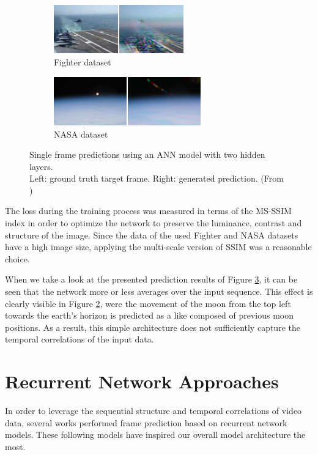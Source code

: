 \begin{figure}[htb]
\centering
\begin{subfigure}{0.5\textwidth}
  \centering
  \includegraphics[height=2.1cm]{figures/related/fighter.png}
  \caption{Fighter dataset}
  \label{fig:aan_samples_fighter}
\end{subfigure}%
\begin{subfigure}{0.5\textwidth}
  \centering
  \includegraphics[height=2.1cm]{figures/related/nasa.png}
  \caption{NASA dataset}
  \label{fig:aan_samples_nasa}
\end{subfigure}
\caption[ANN Frame Prediction]{Single frame predictions using an ANN model with two hidden layers.\\
Left: ground truth target frame. Right: generated prediction. (From \parencite{ann})}
\label{fig:aan_samples}
\end{figure}

The loss during the training process was measured in terms of the MS-SSIM index in order to optimize the network to preserve the luminance, contrast and structure of the image. Since the data of the used Fighter and NASA datasets have a high image size, applying the multi-scale version of SSIM was a reasonable choice.

When we take a look at the presented prediction results of Figure \ref{fig:aan_samples}, it can be seen that the network more or less averages over the input sequence. This effect is clearly visible in Figure \ref{fig:aan_samples_nasa}, were the movement of the moon from the top left towards the earth's horizon is predicted as a like composed of previous moon positions. As a result, this simple architecture does not sufficiently capture the temporal correlations of the input data.

\section{Recurrent Network Approaches}

In order to leverage the sequential structure and temporal correlations of video data, several works performed frame prediction based on recurrent network models. These following models have inspired our overall model architecture the most.

